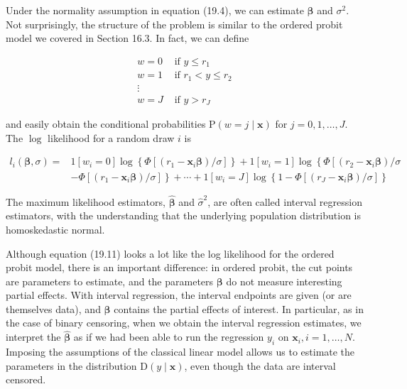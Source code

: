 \documentclass[10pt]{article}
\begin{document}
Under the normality assumption in equation (19.4), we can estimate $\boldsymbol{\beta}$ and $\sigma^{2}$. Not surprisingly, the structure of the problem is similar to the ordered probit model we covered in Section 16.3. In fact, we can define


\begin{align*}
w=0 & \text { if } y \leq r_{1} \\
w=1 & \text { if } r_{1}<y \leq r_{2} \\
\vdots &  \tag{19.10}\\
w=J & \text { if } y>r_{J}
\end{align*}


and easily obtain the conditional probabilities $\mathrm{P}(w=j \mid \mathbf{x})$ for $j=0,1, \ldots, J$. The $\log$ likelihood for a random draw $i$ is


\begin{align*}
l_{i}(\boldsymbol{\beta}, \sigma)= & 1\left[w_{i}=0\right] \log \left\{\Phi\left[\left(r_{1}-\mathbf{x}_{i} \boldsymbol{\beta}\right) / \sigma\right]\right\}+1\left[w_{i}=1\right] \log \left\{\Phi \left[\left(r_{2}-\mathbf{x}_{i} \boldsymbol{\beta}\right) / \sigma\right.\right. \\
& \left.-\Phi\left[\left(r_{1}-\mathbf{x}_{i} \boldsymbol{\beta}\right) / \sigma\right]\right\}+\cdots+1\left[w_{i}=J\right] \log \left\{1-\Phi\left[\left(r_{J}-\mathbf{x}_{i} \boldsymbol{\beta}\right) / \sigma\right]\right\} \tag{19.11}
\end{align*}


The maximum likelihood estimators, $\hat{\boldsymbol{\beta}}$ and $\hat{\sigma}^{2}$, are often called interval regression estimators, with the understanding that the underlying population distribution is homoskedastic normal.

Although equation (19.11) looks a lot like the log likelihood for the ordered probit model, there is an important difference: in ordered probit, the cut points are parameters to estimate, and the parameters $\boldsymbol{\beta}$ do not measure interesting partial effects. With interval regression, the interval endpoints are given (or are themselves data), and $\boldsymbol{\beta}$ contains the partial effects of interest. In particular, as in the case of binary censoring, when we obtain the interval regression estimates, we interpret the $\hat{\boldsymbol{\beta}}$ as if we had been able to run the regression $y_{i}$ on $\mathbf{x}_{i}, i=1, \ldots, N$. Imposing the assumptions of the classical linear model allows us to estimate the parameters in the distribution $\mathrm{D}(y \mid \mathbf{x})$, even though the data are interval censored.
\end{document}
